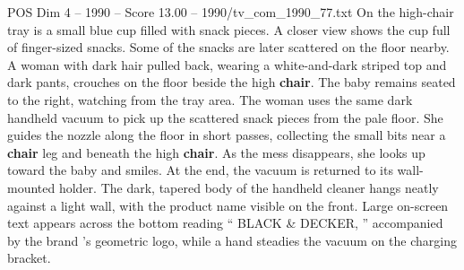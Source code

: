 \begin{textsample}{POS Dim 4 – 1990 – Score 13.00 – 1990/tv\_com\_1990\_77.txt}
On the high-chair tray is a small blue cup filled with snack pieces.
A closer view shows the cup full of finger-sized snacks.
Some of the snacks are later scattered on the floor nearby.
A woman with dark hair pulled back, wearing a white-and-dark striped top and dark pants, crouches on the floor beside the high \textbf{chair}.
The baby remains seated to the right, watching from the tray area.
The woman uses the same dark handheld vacuum to pick up the scattered snack pieces from the pale floor.
She guides the nozzle along the floor in short passes, collecting the small bits near a \textbf{chair} leg and beneath the high \textbf{chair}.
As the mess disappears, she looks up toward the baby and smiles.
At the end, the vacuum is returned to its wall-mounted holder.
The dark, tapered body of the handheld cleaner hangs neatly against a light wall, with the product name visible on the front.
Large on-screen text appears across the bottom reading “ BLACK \& DECKER, ” accompanied by the brand ’s geometric logo, while a hand steadies the vacuum on the charging bracket.

\end{textsample}
